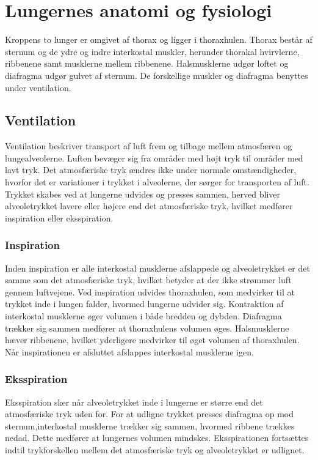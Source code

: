 \section{Lungernes anatomi og fysiologi} \label{BilagA}
Kroppens to lunger er omgivet af thorax og ligger i thoraxhulen. Thorax består af sternum og de ydre og indre interkostal muskler, herunder thorakal hvirvlerne, ribbenene samt musklerne mellem ribbenene. Halsmusklerne udgør loftet og diafragma udgør gulvet af sternum. De forskellige muskler og diafragma benyttes under ventilation. \citep{Martini2012, Sand2008}

\subsection{Ventilation}
Ventilation beskriver transport af luft frem og tilbage mellem atmosfæren og lungealveolerne. Luften bevæger sig fra områder med højt tryk til områder med lavt tryk. Det atmosfæriske tryk ændres ikke under normale omstændigheder, hvorfor det er variationer i trykket i alveolerne, der sørger for transporten af luft. Trykket skabes ved at lungerne udvides og presses sammen, herved bliver alveoletrykket lavere eller højere end det atmosfæriske tryk, hvilket medfører inspiration eller eksspiration. \citep{Martini2012, Sand2008}

\subsubsection{Inspiration}
Inden inspiration er alle interkostal musklerne afslappede og alveoletrykket er det samme som det atmosfæriske tryk, hvilket betyder at der ikke strømmer luft gennem luftvejene. Ved inspiration udvides thoraxhulen, som medvirker til at trykket inde i lungen falder, hvormed  lungerne udvider sig. Kontraktion af interkostal musklerne øger volumen i både bredden og dybden. Diafragma trækker sig sammen medfører at thoraxhulens volumen øges. Halsmusklerne hæver ribbenene, hvilket yderligere medvirker til øget volumen af thoraxhulen. Når inspirationen er afsluttet afslappes interkostal musklerne igen.\citep{Martini2012, Sand2008}

\subsubsection{Eksspiration}
Eksspiration sker når alveoletrykket inde i lungerne er større end det atmosfæriske tryk uden for. For at udligne trykket presses diafragma op mod sternum,interkostal musklerne trækker sig sammen, hvormed ribbene trækkes nedad. Dette medfører at lungernes volumen mindskes. Eksspirationen fortsættes indtil trykforskellen mellem det atmosfæriske tryk og alveoletrykket er udlignet. \citep{Martini2012, Sand2008}

